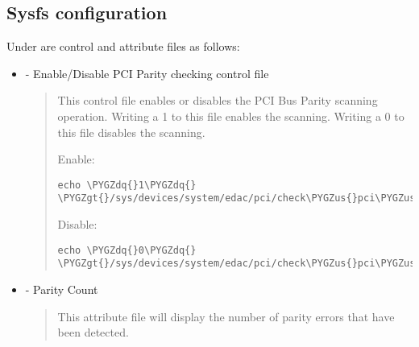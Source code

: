 \documentclass[a4paper,8pt,english]{sphinxmanual}
\def\PYGZus{\char`\_}
\def\PYGZgt{\char`\>}
\def\PYGZdq{\char`\"}
\begin{document}
\subsection{Sysfs configuration}
\label{admin-guide/ras:sysfs-configuration}
Under  are control and attribute files as
follows:
\begin{itemize}
\item {} 
 - Enable/Disable PCI Parity checking control file
\begin{quote}

This control file enables or disables the PCI Bus Parity scanning
operation. Writing a 1 to this file enables the scanning. Writing
a 0 to this file disables the scanning.

Enable:

\begin{Verbatim}[commandchars=\\\{\}]
echo \PYGZdq{}1\PYGZdq{} \PYGZgt{}/sys/devices/system/edac/pci/check\PYGZus{}pci\PYGZus{}parity
\end{Verbatim}

Disable:

\begin{Verbatim}[commandchars=\\\{\}]
echo \PYGZdq{}0\PYGZdq{} \PYGZgt{}/sys/devices/system/edac/pci/check\PYGZus{}pci\PYGZus{}parity
\end{Verbatim}
\end{quote}

\item {} 
 - Parity Count
\begin{quote}

This attribute file will display the number of parity errors that
have been detected.
\end{quote}

\end{itemize}
\end{document}
